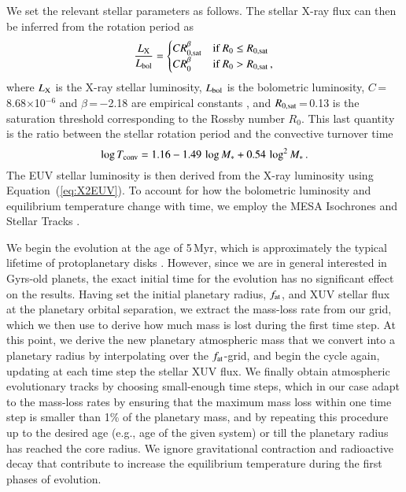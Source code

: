 \documentclass{aa}
\begin{document}
{We set the relevant stellar parameters as follows. The stellar
X-ray flux can then be inferred from the rotation period as
\citep{wright2011}
\begin{equation}
\label{eq:Xluminosity}
\frac{L_{\rm X}}{L_{\rm bol}} =
    \begin{cases}
    CR_{\rm 0,sat}^{\beta} & \text{if $R_0\leq R_{\rm 0,sat}$}\\
    CR_0^{\beta}  & \text{if $R_0>R_{\rm 0,sat}$}\,,
    \end{cases}
\end{equation}
where $L_{\rm X}$ is the X-ray stellar luminosity, $L_{\rm bol}$ is the bolometric luminosity, $C$\,=\,8.68$\times$10$^{-6}$ and $\beta$\,=\,$-$2.18 are empirical constants \citep{pizzolato2003,wright2011}, and $R_{\rm 0,sat}$\,=\,0.13 is the saturation threshold corresponding to the Rossby number $R_0$. This last quantity is the ratio between the stellar rotation period and the convective turnover time \citep[$T_{\rm conv}$;][]{wright2011}
\begin{equation}
\label{eq:Tconv}
\log{T_{\rm conv}}=1.16-1.49\,\log{M_*}+0.54\,\log^2{M_*}\,.
\end{equation}
The EUV stellar luminosity is then derived from the X-ray luminosity using Equation~(\ref{eq:X2EUV}). To account for how the bolometric luminosity and equilibrium temperature change with time, we employ the MESA Isochrones and Stellar Tracks \citep[MIST;][]{paxton2018}.}

We begin the evolution at the age of 5\,Myr, which is
approximately the typical lifetime of protoplanetary disks
\citep{mamajek2009}. However, since we are in general interested
in Gyrs-old planets, the exact initial time for the evolution has
no significant effect on the results. {Having set the initial
planetary radius, $f_{\rm at}$, and XUV stellar flux at the
planetary orbital separation, we extract the mass-loss rate from
our grid, which we then use to derive how much mass is lost during
the first time step. At this point, we derive the new planetary
atmospheric mass that we convert into a planetary radius by
interpolating over the $f_{\rm at}$-grid, and begin the cycle
again, updating at each time step the stellar XUV flux. We finally
obtain atmospheric evolutionary tracks by choosing small-enough
time steps, which in our case adapt to the mass-loss rates by
ensuring that the maximum mass loss within one time step is
smaller than 1\% of the planetary mass, and by repeating this
procedure up to the desired age (e.g., age of the given system) or
till the planetary radius has reached the core radius. We ignore
gravitational contraction and radioactive decay that contribute to
increase the equilibrium temperature during the first phases of
evolution.}
%
\end{document}
